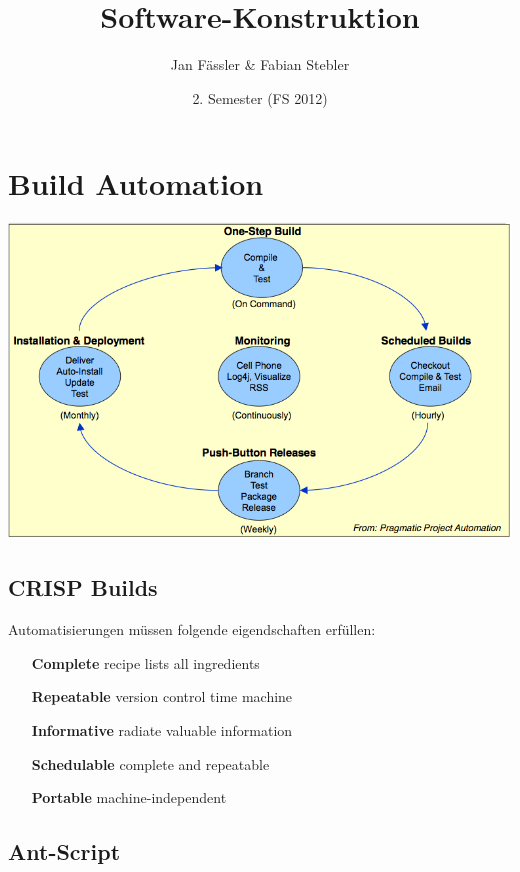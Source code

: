 \documentclass[a4paper,10pt]{article}
\title{Software-Konstruktion}
\author{Jan F\"assler \& Fabian Stebler}
\date{2. Semester (FS 2012)}
\newcommand{\Bold}[1]{\textbf{#1}} %
\begin{document}
\maketitle
\thispagestyle{fancy} %
\newpage


\section{Build Automation}
\includegraphics[scale=0.6]{build_automation.png}

\subsection{CRISP Builds}
Automatisierungen m\"ussen folgende eigendschaften erf\"ullen:
\begin{itemize}
	\item[\Bold {Complete}] recipe lists all ingredients
	\item[\Bold {Repeatable}] version control time machine
	\item[\Bold {Informative}] radiate valuable information
	\item[\Bold {Schedulable}] complete and repeatable
	\item[\Bold {Portable}] machine-independent
\end{itemize}

\subsection{Ant-Script}


\newpage
\end{document}
